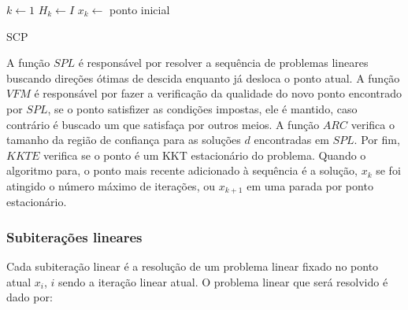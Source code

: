 \begin{algorithm}[H]
  \SetAlgoLined
  \( k \gets 1 \)\;
  \( H_k \gets I \)\;
  \( x_k \gets \) ponto inicial\;
  
  \caption{SCP}
\end{algorithm}
\vspace{15pt}


A função \(SPL\) é responsável por resolver a sequência de problemas lineares
buscando direções ótimas de descida enquanto já desloca o ponto atual. A função
\(VFM\) é responsável por fazer a verificação da qualidade do novo ponto encontrado
por \(SPL\), se o ponto satisfizer as condições impostas, ele é mantido, caso contrário
é buscado um que satisfaça por outros meios. A função \(ARC\) verifica o tamanho da região
de confiança para as soluções \(d\) encontradas em \(SPL\). Por fim, \(KKTE\) verifica
se o ponto é um KKT estacionário do problema. Quando o algoritmo para, o ponto
mais recente adicionado à sequência é a solução, \(x_k\) se foi atingido
o número máximo de iterações, ou \(x_{k+1}\) em uma parada por ponto
estacionário.

\subsubsection{Subiterações lineares}

Cada subiteração linear é a resolução de um problema linear fixado no ponto
atual \( x_i \), \(i\) sendo a iteração linear atual. O problema linear que
será resolvido é dado por:


